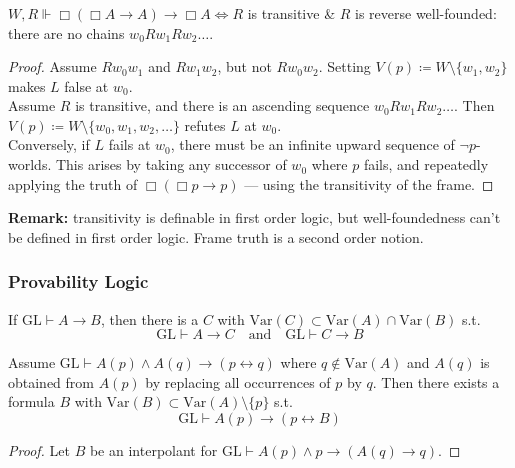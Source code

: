 \documentclass[UTF8,aspectratio=43,11pt,colorlinks,compress,openany]{beamer}%
\begin{document}
\begin{frame}\frametitle{}
\begin{theorem}
$W,R\Vdash\Box(\Box A\to A)\to\Box A \iff R$ is transitive \& $R$ is reverse well-founded: there are no chains $w_0Rw_1Rw_2\dots$.
\end{theorem}
\begin{proof}
Assume $Rw_0w_1$ and $Rw_1w_2$, but not $Rw_0w_2$. Setting $V(p)\coloneqq W\setminus\{w_1,w_2\}$ makes $L$ false at $w_0$.\\
Assume $R$ is transitive, and there is an ascending sequence $w_0Rw_1Rw_2\dots$. Then $V(p)\coloneqq W\setminus\{w_0,w_1,w_2,\dots\}$ refutes $L$ at $w_0$.\\
Conversely, if $L$ fails at $w_0$, there must be an infinite upward sequence of $\neg p$-worlds. This arises by taking any successor of $w_0$ where $p$ fails, and repeatedly applying the truth of $\Box(\Box p\to p)$ --- using the transitivity of the frame.
\end{proof}
\textbf{Remark:} transitivity is definable in first order logic, but well-foundedness can't be defined in first order logic. Frame truth is a second order notion.
\end{frame}

\begin{frame}\frametitle{Provability Logic}
\setlength\abovedisplayskip{0pt}
\setlength\belowdisplayskip{0pt}
	\begin{theorem}
		If $\mathrm{GL}\vdash A\to B$, then there is a $C$ with $\mathrm{Var}(C)\subset \mathrm{Var}(A)\cap \mathrm{Var}(B)$ s.t.
		\[\mathrm{GL}\vdash A\to C\quad\mbox{and}\quad\mathrm{GL}\vdash C\to B\]
	\end{theorem}
	\begin{corollary}
		Assume $\mathrm{GL}\vdash A(p)\wedge A(q)\to(p\leftrightarrow q)$ where $q\notin \mathrm{Var}(A)$ and $A(q)$ is obtained from $A(p)$ by replacing all occurrences of $p$ by $q$. Then there exists a formula $B$ with $\mathrm{Var}(B)\subset \mathrm{Var}(A)\setminus\{p\}$ s.t.
		\[\mathrm{GL}\vdash A(p)\to(p\leftrightarrow B)\]
	\end{corollary}
	\begin{proof}
		Let $B$ be an interpolant for $\mathrm{GL}\vdash A(p)\wedge p\to(A(q)\to q)$.
	\end{proof}
\end{frame}
\end{document}
